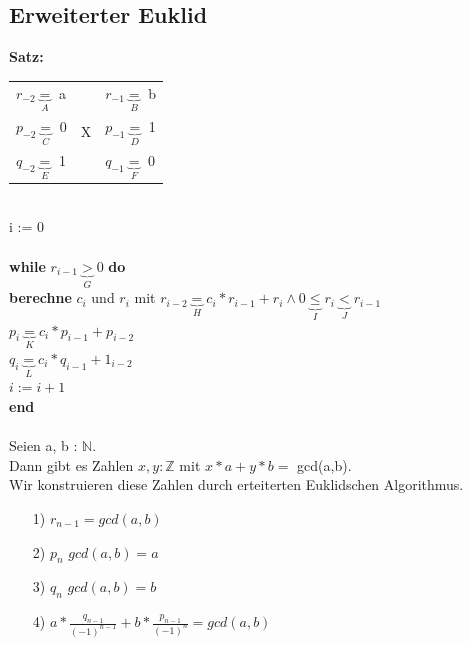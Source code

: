 \documentclass[a4paper,10pt]{article}
\newcommand{\NN}{\mathbb{N}} %
\newcommand{\ZN}{\mathbb{Z}} %
\newcommand{\Bold}[1]{\textbf{#1}} %
\begin{document}
\subsection{Erweiterter Euklid}

\Bold {Satz:} \\
\begin{tabular}{l c l}
	$r_{-2} \underbrace{=}_{A}$ a & & $r_{-1} \underbrace{=}_{B}$ b\\
	$p_{-2} \underbrace{=}_{C}$ 0 & X & $p_{-1} \underbrace{=}_{D}$ 1 \\
	$q_{-2} \underbrace{=}_{E}$ 1 & & $q_{-1} \underbrace{=}_{F}$ 0 \\
\end{tabular} \\
i := 0 \\ \\
\Bold {while} $r_{i-1} \underbrace{>}_{G} 0$ \Bold {do} \\
\Bold {berechne} $c_i$ und $r_i$ mit $r_{i-2} \underbrace{=}_{H} c_i * r_{i-1} + r_i \wedge 0 \underbrace{\leq}_{I} r_i \underbrace{<}_{J} r_{i-1}$ \\
$p_i \underbrace{=}_{K} c_i * p_{i-1} + p_{i-2}$ \\
$q_i \underbrace{=}_{L} c_i*q_{i-1} + 1_{i-2}$ \\
$i:=i+1$ \\
\Bold {end} \\ 
\\
Seien a, b : $\NN$. \\
Dann gibt es Zahlen $x,y : \ZN$ mit $x*a + y*b =$ gcd(a,b). \\
Wir konstruieren diese Zahlen durch erteiterten Euklidschen Algorithmus. 
\begin{itemize}
	\item[1)] $r_{n-1} =gcd(a,b)$ 
	\item[2)] $p_n$ $gcd(a,b) = a$
	\item[3)] $q_n$ $gcd(a,b) = b$
	\item[4)] $a * \frac{q_{n-1}}{(-1)^{n-1}} + b * \frac{p_{n-1}}{(-1)^n}=gcd(a,b)$
\end{itemize}
\end{document}
